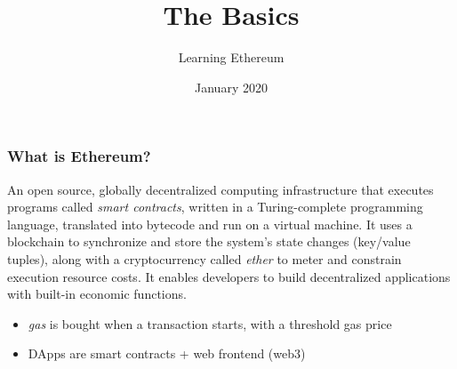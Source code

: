 \documentclass[11pt]{beamer}  %
\subtitle{Learning Ethereum}
\title{The Basics}
\institute{Universit\`a di Verona, Italy}
\date{January 2020}
\begin{document}
\begin{frame}
  \titlepage
\end{frame}

\begin{frame}
  \frametitle{What is Ethereum?}

  \begin{greenbox}{}
    An open source, globally decentralized computing infrastructure
    that executes programs called \emph{smart contracts}, written
    in a Turing-complete programming language, translated into
    bytecode and run on a virtual machine. It uses a
    blockchain to synchronize and store the system's state changes
    (key/value tuples), along
    with a cryptocurrency called \emph{ether} to meter and constrain
    execution resource costs. It enables developers to build
    decentralized applications with built-in economic functions.
  \end{greenbox}

  \begin{itemize}
  \item \emph{gas} is bought when a transaction starts, with a threshold
    gas price
  \item DApps are smart contracts + web frontend (web3)
  \end{itemize}
  
\end{frame}
\end{document}
